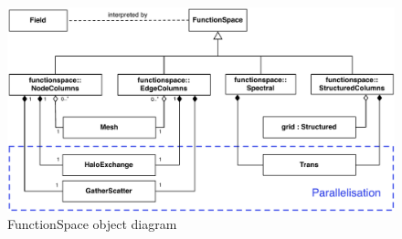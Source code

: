 \begin{figure}
\centering
\includegraphics[width=\textwidth]{imgs/functionspace.pdf}
\caption{FunctionSpace object diagram \label{fig:functionspace}}
\end{figure}
%
